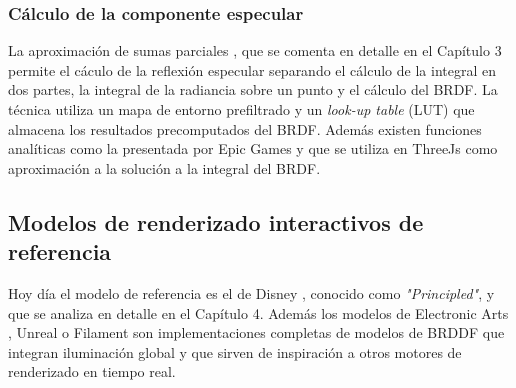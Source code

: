             \subsubsection*{C\'alculo de la componente especular}
            La aproximaci\'on de sumas parciales \autocite{unreal}, que se comenta en detalle en el Cap\'itulo 3 permite el c\'aculo de la reflexi\'on especular separando el c\'alculo
            de la integral en dos partes, la integral de la radiancia sobre un punto y el c\'alculo del BRDF. La t\'ecnica utiliza
            un mapa de entorno prefiltrado y un \textit{look-up table} (LUT) que almacena los resultados precomputados del BRDF.
            Adem\'as existen funciones anal\'iticas como la presentada por Epic Games \autocite{dfgapproximation} y que se utiliza en ThreeJs
            como aproximaci\'on a la soluci\'on a la integral del BRDF.
            

        \subsection{Modelos de renderizado interactivos de referencia}
        Hoy d\'ia el modelo de referencia es el de Disney \autocite{disney12} \autocite{disney15}, conocido como \textit{"Principled"},
        y que se analiza en detalle en el Cap\'itulo 4. Adem\'as los modelos de Electronic Arts \autocite{frostbite}, Unreal \autocite{unreal}
        o Filament \autocite{filament} son implementaciones completas de modelos de BRDDF que integran iluminaci\'on global y  que sirven
        de inspiraci\'on a otros motores de renderizado en tiempo real.
